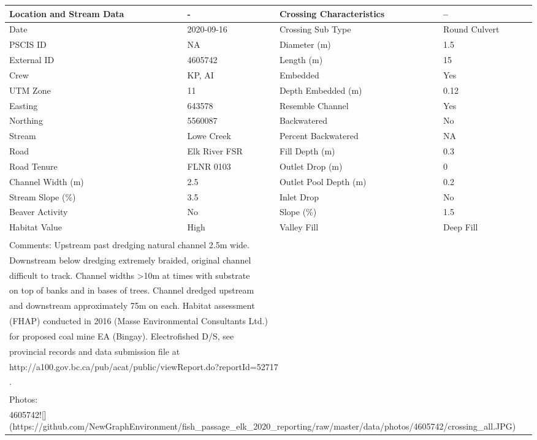 \documentclass[
]{book}
\begin{document}
\begin{tabular}{l|l|l|l}
\hline
Location and Stream Data & - & Crossing Characteristics & --\\
\hline
Date & 2020-09-16 & Crossing Sub Type & Round Culvert\\
\hline
PSCIS ID & NA & Diameter (m) & 1.5\\
\hline
External ID & 4605742 & Length (m) & 15\\
\hline
Crew & KP, AI & Embedded & Yes\\
\hline
UTM Zone & 11 & Depth Embedded (m) & 0.12\\
\hline
Easting & 643578 & Resemble Channel & Yes\\
\hline
Northing & 5560087 & Backwatered & No\\
\hline
Stream & Lowe Creek & Percent Backwatered & NA\\
\hline
Road & Elk River FSR & Fill Depth (m) & 0.3\\
\hline
Road Tenure & FLNR 0103 & Outlet Drop (m) & 0\\
\hline
Channel Width (m) & 2.5 & Outlet Pool Depth (m) & 0.2\\
\hline
Stream Slope (\%) & 3.5 & Inlet Drop & No\\
\hline
Beaver Activity & No & Slope (\%) & 1.5\\
\hline
Habitat Value & High & Valley Fill & Deep Fill\\
\hline
\multicolumn{4}{l}{\textsuperscript{} Comments: Upstream past dredging natural channel 2.5m wide.}\\
\multicolumn{4}{l}{Downstream below dredging extremely braided, original channel}\\
\multicolumn{4}{l}{difficult to track. Channel widths >10m at times with substrate}\\
\multicolumn{4}{l}{on top of banks and in bases of trees. Channel dredged upstream}\\
\multicolumn{4}{l}{and downstream approximately 75m on each. Habitat assessment}\\
\multicolumn{4}{l}{(FHAP) conducted in 2016 (Masse Environmental Consultants Ltd.)}\\
\multicolumn{4}{l}{for proposed coal mine EA (Bingay). Electrofished D/S, see}\\
\multicolumn{4}{l}{provincial records and data submission file at}\\
\multicolumn{4}{l}{http://a100.gov.bc.ca/pub/acat/public/viewReport.do?reportId=52717}\\
\multicolumn{4}{l}{.}\\
\multicolumn{4}{l}{\textsuperscript{} Photos:}\\
\multicolumn{4}{l}{4605742![](https://github.com/NewGraphEnvironment/fish\_passage\_elk\_2020\_reporting/raw/master/data/photos/4605742/crossing\_all.JPG)}\\
\end{tabular}
\end{document}
